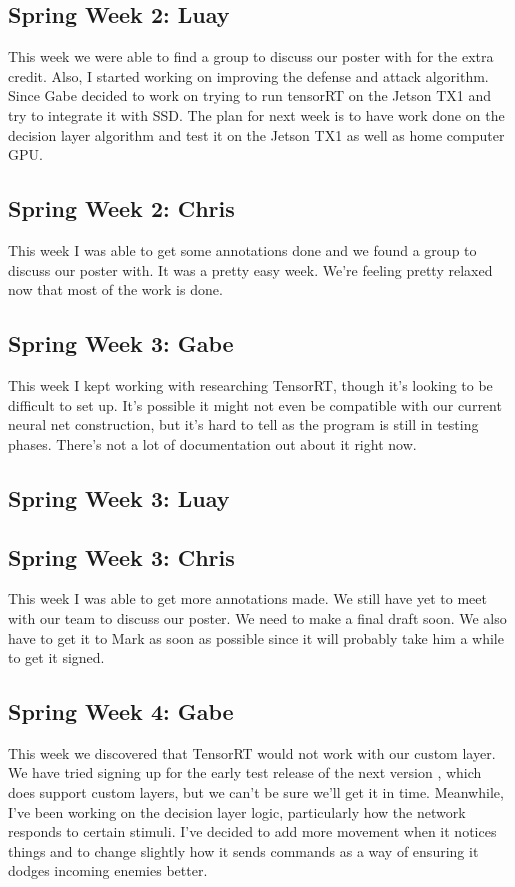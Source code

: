 \documentclass[onecolumn, draftclsnofoot,10pt, compsoc]{IEEEtran}
\begin{document}
\subsection{Spring Week 2: Luay}
This week we were able to find a group to discuss our poster with for the extra credit. Also, I started working on improving the defense and attack algorithm. Since Gabe decided to work on trying to run tensorRT on the Jetson TX1 and try to integrate it with SSD. The plan for next week is to have work done on the decision layer algorithm and test it on the Jetson TX1 as well as home computer GPU.
\subsection{Spring Week 2: Chris}
This week I was able to get some annotations done and we found a group to discuss our poster with. It was a pretty easy week. We're feeling pretty relaxed now that most of the work is done.
\subsection{Spring Week 3: Gabe}
This week I kept working with researching TensorRT, though it's looking to be difficult to set up. It's possible it might not even be compatible with our current neural net construction, but it's hard to tell as the program is still in testing phases. There's not a lot of documentation out about it right now.
\subsection{Spring Week 3: Luay}
\subsection{Spring Week 3: Chris}
This week I was able to get more annotations made. We still have yet to meet with our team to discuss our poster. We need to make a final draft soon. We also have to get it to Mark as soon as possible since it will probably take him a while to get it signed.
\subsection{Spring Week 4: Gabe}
This week we discovered that TensorRT would not work with our custom layer. We have tried signing up for the early test release of the next version , which does support custom layers, but we can't be sure we'll get it in time. Meanwhile, I've been working on the decision layer logic, particularly how the network responds to certain stimuli. I've decided to add more movement when it notices things and to change slightly how it sends commands as a way of ensuring it dodges incoming enemies better.
\end{document}
